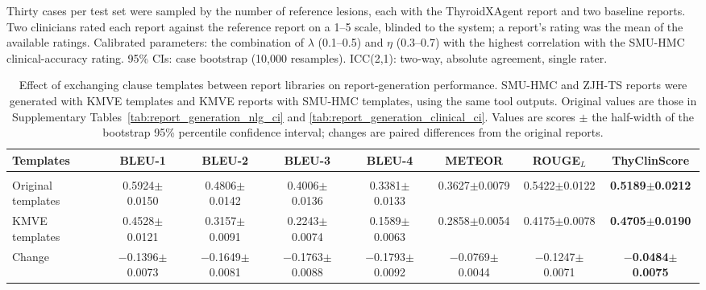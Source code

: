 \documentclass[fleqn,10pt]{wlscirep}
\begin{document}
\begin{appendices}
\begin{table}[p]
\begin{threeparttable}
\begin{tablenotes}[flushleft]
\footnotesize
\item Thirty cases per test set were sampled by the number of reference lesions, each with the ThyroidXAgent report and two baseline reports. Two clinicians rated each report against the reference report on a 1--5 scale, blinded to the system; a report's rating was the mean of the available ratings. Calibrated parameters: the combination of $\lambda$ (0.1--0.5) and $\eta$ (0.3--0.7) with the highest correlation with the SMU-HMC clinical-accuracy rating. 95\% CIs: case bootstrap (10,000 resamples). ICC(2,1): two-way, absolute agreement, single rater.
\end{tablenotes}

\end{threeparttable}
\end{table}
\clearpage

\begin{table}[p]
\centering
\begin{threeparttable}
\caption{Effect of exchanging clause templates between report libraries on report-generation performance. SMU-HMC and ZJH-TS reports were generated with KMVE templates and KMVE reports with SMU-HMC templates, using the same tool outputs. Original values are those in Supplementary Tables~\ref{tab:report_generation_nlg_ci} and \ref{tab:report_generation_clinical_ci}. Values are scores $\pm$ the half-width of the bootstrap 95\% percentile confidence interval; changes are paired differences from the original reports.}
\label{tab:template_exchange}

\scriptsize
\setlength{\tabcolsep}{2.0pt}
\renewcommand{\arraystretch}{1.08}

\begin{tabular}{lccccccc}
\toprule
\textbf{Templates}
& \textbf{BLEU-1}
& \textbf{BLEU-2}
& \textbf{BLEU-3}
& \textbf{BLEU-4}
& \textbf{METEOR}
& \textbf{ROUGE$_L$}
& \textbf{ThyClinScore} \\
\midrule

\rowcolor{gray!20}
\multicolumn{8}{c}{\textbf{SMU-HMC Testset} ($n=400$)} \\
Original templates
& 0.5924$\pm$0.0150
& 0.4806$\pm$0.0142
& 0.4006$\pm$0.0136
& 0.3381$\pm$0.0133
& 0.3627$\pm$0.0079
& 0.5422$\pm$0.0122
& \textbf{0.5189$\pm$0.0212} \\
KMVE templates
& 0.4528$\pm$0.0121
& 0.3157$\pm$0.0091
& 0.2243$\pm$0.0074
& 0.1589$\pm$0.0063
& 0.2858$\pm$0.0054
& 0.4175$\pm$0.0078
& \textbf{0.4705$\pm$0.0190} \\
\quad Change
& $-$0.1396$\pm$0.0073
& $-$0.1649$\pm$0.0081
& $-$0.1763$\pm$0.0088
& $-$0.1793$\pm$0.0092
& $-$0.0769$\pm$0.0044
& $-$0.1247$\pm$0.0071
& \textbf{$-$0.0484$\pm$0.0075} \\


\end{tabular}
\end{threeparttable}
\end{table}
\end{appendices}
\end{document}

